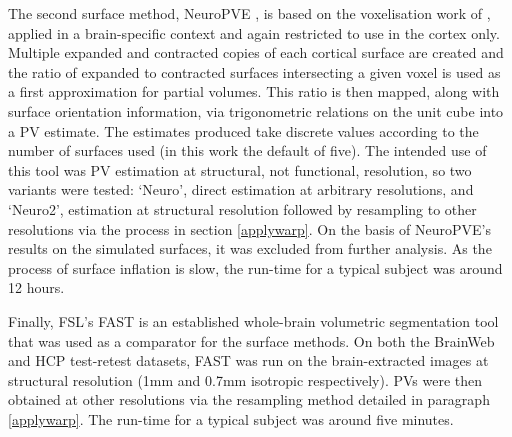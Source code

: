 The second surface method, NeuroPVE \cite{NeuropolyPVE}, is based on the voxelisation work of \cite{Nooruddin2003}, applied in a brain-specific context and again restricted to use in the cortex only. Multiple expanded and contracted copies of each cortical surface are created and the ratio of expanded to contracted surfaces intersecting a given voxel is used as a first approximation for partial volumes. This ratio is then mapped, along with surface orientation information, via trigonometric relations on the unit cube into a PV estimate. The estimates produced take discrete values according to the number of surfaces used (in this work the default of five). The intended use of this tool was PV estimation at structural, not functional, resolution, so two variants were tested: ‘Neuro’, direct estimation at arbitrary resolutions, and ‘Neuro2’, estimation at structural resolution followed by resampling to other resolutions via the process in section \ref{applywarp}. On the basis of NeuroPVE’s results on the simulated surfaces, it was excluded from further analysis. As the process of surface inflation is slow, the run-time for a typical subject was around 12 hours. 

Finally, FSL’s FAST \cite{Zhang2001} is an established whole-brain volumetric segmentation tool that was used as a comparator for the surface methods. On both the BrainWeb and HCP test-retest datasets, FAST was run on the brain-extracted images at structural resolution (1mm and 0.7mm isotropic respectively). PVs were then obtained at other resolutions via the resampling method detailed in paragraph \ref{applywarp}. The run-time for a typical subject was around five minutes. 


